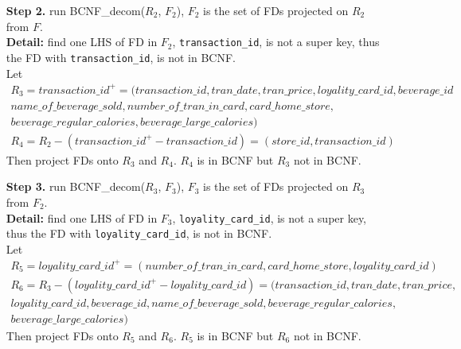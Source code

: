 \documentclass[10pt]{article}
\begin{document}
\begin{enumerate}
\begin{enumerate}
\begin{mdframed}[leftmargin=-6.5mm]
\begin{itemize}[leftmargin=16mm]
            \item[\textbf{Step 2. }]run BCNF\_decom($R_2$, $F_2$), $F_2$ is the set of FDs projected on $R_2$ from $F$.\\
            \textbf{Detail:} find one LHS of FD in $F_2$, \texttt{transaction\_id}, is not a super key, thus the FD with \texttt{transaction\_id}, is not in BCNF.\\
            Let\\
            \begin{gather*}
                R_3 = transaction\_id^+ = (transaction\_id, tran\_date, tran\_price, loyality\_card\_id, beverage\_id\\
                name\_of\_beverage\_sold, number\_of\_tran\_in\_card, card\_home\_store,\\ beverage\_regular\_calories,
                beverage\_large\_calories)\\
                R_4 = R_2 - (transaction\_id^+ - transaction\_id) = (store\_id, transaction\_id)
            \end{gather*}
            Then project FDs onto $R_3$ and $R_4$. $R_4$ is in BCNF but $R_3$ not in BCNF.
            
            \item[\textbf{Step 3. }]run BCNF\_decom($R_3$, $F_3$), $F_3$ is the set of FDs projected on $R_3$ from $F_2$.\\
            \textbf{Detail:} find one LHS of FD in $F_3$, \texttt{loyality\_card\_id}, is not a super key, thus the FD with \texttt{loyality\_card\_id}, is not in BCNF.\\
            Let\\
            \begin{gather*}
                R_5 = loyality\_card\_id^+ = (number\_of\_tran\_in\_card, card\_home\_store, loyality\_card\_id)\\
                R_6 = R_3 - (loyality\_card\_id^+ - loyality\_card\_id) = (transaction\_id, tran\_date, tran\_price,\\ loyality\_card\_id, beverage\_id, name\_of\_beverage\_sold, beverage\_regular\_calories,\\
                beverage\_large\_calories)
            \end{gather*}
             Then project FDs onto $R_5$ and $R_6$. $R_5$ is in BCNF but $R_6$ not in BCNF.
             

\end{itemize}
\end{mdframed}
\end{enumerate}
\end{enumerate}
\end{document}
